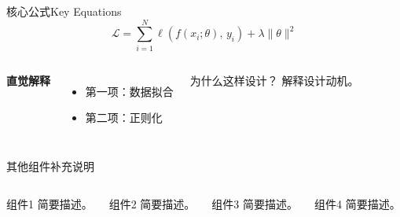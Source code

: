 \begin{frame}{核心公式}{Key Equations}
  \begin{equation*}
    \mathcal{L} = \sum_{i=1}^{N} \ell(f(x_i;\theta),\, y_i) + \lambda \|\theta\|^2
  \end{equation*}

  \begin{columns}[T, onlytextwidth]
      \textbf{\color{mustblue}直觉解释}
      \begin{itemize}
        \item 第一项：数据拟合
        \item 第二项：正则化
      \end{itemize}
      \begin{block}{为什么这样设计？}
        \footnotesize
        解释设计动机。
      \end{block}
  \end{columns}
\end{frame}

\begin{frame}{其他组件}{补充说明}
  \begin{columns}[T, onlytextwidth]
      \begin{block}{组件1}
        \footnotesize
        简要描述。
      \end{block}
      \begin{block}{组件2}
        \footnotesize
        简要描述。
      \end{block}
      \begin{block}{组件3}
        \footnotesize
        简要描述。
      \end{block}
      \begin{block}{组件4}
        \footnotesize
        简要描述。
      \end{block}
  \end{columns}
\end{frame}
